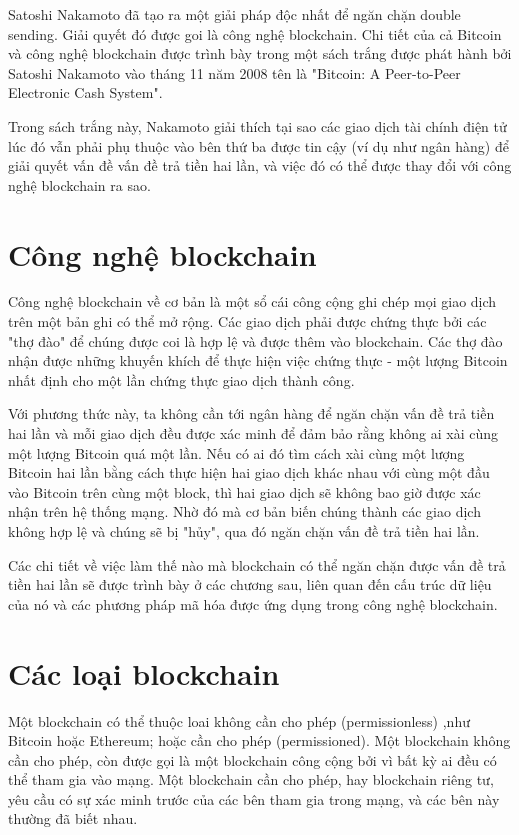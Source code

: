 Satoshi Nakamoto đã tạo ra một giải pháp độc nhất để ngăn chặn double sending. Giải quyết đó được goi là công nghệ blockchain. Chi tiết của cả Bitcoin và công nghệ blockchain được trình bày trong một sách trắng được phát hành bởi Satoshi Nakamoto vào tháng 11 năm 2008 tên là "Bitcoin: A Peer-to-Peer Electronic Cash System". 

Trong sách trắng này, Nakamoto giải thích tại sao các giao dịch tài chính điện tử lúc đó vẫn phải phụ thuộc vào bên thứ ba được tin cậy (ví dụ như ngân hàng) để giải quyết vấn đề vấn đề trả tiền hai lần, và việc đó có thể được thay đổi với công nghệ blockchain ra sao.

\section{Công nghệ blockchain}

Công nghệ blockchain về cơ bản là một sổ cái công cộng ghi chép mọi giao dịch trên một bản ghi có thể mở rộng. Các giao dịch phải được chứng thực bởi các "thợ đào" để chúng được coi là hợp lệ và được thêm vào blockchain. Các thợ đào nhận được những khuyến khích để thực hiện việc chứng thực - một lượng Bitcoin nhất định cho một lần chứng thực giao dịch thành công.

Với phương thức này, ta không cần tới ngân hàng để ngăn chặn vấn đề trả tiền hai lần và mỗi giao dịch đều được xác minh để đảm bảo rằng không ai xài cùng một lượng Bitcoin quá một lần. Nếu có ai đó tìm cách xài cùng một lượng Bitcoin hai lần bằng cách thực hiện hai giao dịch khác nhau với cùng một đầu vào Bitcoin trên cùng một block, thì hai giao dịch sẽ không bao giờ được xác nhận trên hệ thống mạng. Nhờ đó mà cơ bản biến chúng thành các giao dịch không hợp lệ và chúng sẽ bị "hủy", qua đó ngăn chặn vấn đề trả tiền hai lần.

Các chi tiết về việc làm thế nào mà blockchain có thể ngăn chặn được vấn đề trả tiền hai lần sẽ được trình bày ở các chương sau, liên quan đến cấu trúc dữ liệu của nó và các phương pháp mã hóa được ứng dụng trong công nghệ blockchain.

\section{Các loại blockchain}
Một blockchain có thể thuộc loai không cần cho phép (permissionless) ,như Bitcoin hoặc Ethereum; hoặc cần cho phép (permissioned). Một blockchain không cần cho phép, còn được gọi là một blockchain công cộng bởi vì bất kỳ ai đều có thể tham gia vào mạng. Một blockchain cần cho phép, hay blockchain riêng tư, yêu cầu có sự xác minh trước của các bên tham gia trong mạng, và các bên này thường đã biết nhau.

